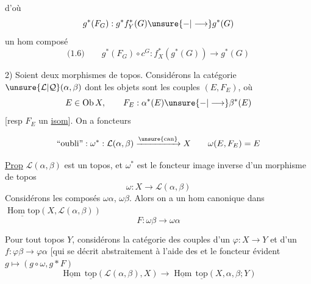 d'où
\[
g^*(F_G):g^*f_Y^*(G)\unsure{-|\longrightarrow}g^*(G)
\]
un hom composé
\[
\text{(1.6)}\qquad g^*(F_G)\circ c^G:f_X^*(g^*(G))\longrightarrow g^*(G)
\]

2) Soient
deux morphismes de topos.  Considérons la catégorie $\unsure{\mathcal L|\mathcal Q}(\alpha,\beta)$ dont les objets sont les couples $(E,F_E)$, où 
\[
E\in\operatorname{Ob}X,\qquad F_E:\alpha^*(E)\unsure{-|\longrightarrow}\beta^*(E)
\]
[resp $F_E$ un \uline{isom}]. On a  foncteurs

\[
\text{``oubli''}:\omega^*:\mathcal L(\alpha,\beta)\xrightarrow{\unsure{\mathrm{can}}}X
\qquad\omega(E,F_E)=E
\]

\margin{$\big|$}
\uline{Prop} $\mathcal L(\alpha,\beta)$ est un topos, et $\omega^*$ est le foncteur image inverse d'un morphisme de topos
\[
\omega:X\longrightarrow\mathcal L(\alpha,\beta)
\]
\margin{$\big|$}
Considérons les composés $\omega\alpha$, $\omega\beta$. Alors on a un hom canonique  dans $\underline{\operatorname{Hom}\mathrm{top}}(X,\mathcal L(\alpha,\beta))$
\[
F:\omega\beta\longrightarrow\omega\alpha
\]

\margin{$\big|$}
Pour tout topos $Y$, considérons la catégorie  des  couples  d'un   $\varphi:X\longrightarrow Y$ et d'un $f:\varphi\beta\longrightarrow\varphi\alpha$ [qui se décrit abstraitement à l'aide des
et le foncteur évident $g\longmapsto(g\circ\omega,g*F)$
\[
\underline{\operatorname{Hom}}\,\underline{\mathrm{top}}(\mathcal L(\alpha,\beta),X)\longrightarrow\underline{\operatorname{Hom}}\,\underline{\mathrm{top}}(X,\alpha,\beta;Y)
\]
